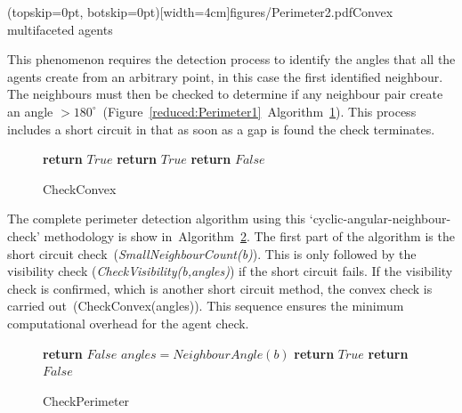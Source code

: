 \documentclass{ieeeaccess}
\begin{document}
\Figure[t!](topskip=0pt, botskip=0pt)[width=4cm]{figures/Perimeter2.pdf}{Convex multifaceted agents\label{reduced:Perimeter2}}

This phenomenon requires the detection process to identify the angles that all the agents create from an arbitrary point, in this case the first identified neighbour. The neighbours must then be checked to determine if any neighbour pair create an angle $> 180^\circ$~(Figure~\ref{reduced:Perimeter1}~Algorithm~\ref{algo:checkConvex}). This process includes a short circuit in that as soon as a gap is found the check terminates. 

\begin{figure}
\begin{algorithmic}[1]
			\State \textbf{return} $True$ 
   	\EndIf
		\State \textbf{return} $True$ 
	\EndIf
\EndFor
\State \textbf{return} $False$ 
\EndProcedure
\end{algorithmic}
\caption{CheckConvex}
\label{algo:checkConvex}
\end{figure}


The complete perimeter detection algorithm using this `cyclic-angular-neighbour-check' methodology is show in~Algorithm~\ref{algo:checkPerimeter}. The first part of the algorithm is the short circuit check~(\textit{SmallNeighbourCount(b)}). This is only followed by the visibility check (\textit{CheckVisibility(b,angles)}) if the short circuit fails. If the visibility check is confirmed, which is another short circuit method, the convex check is carried out~(CheckConvex(angles)). This sequence ensures the minimum computational overhead for the agent check. 

\begin{figure}
\begin{algorithmic}[1]
	\State \textbf{return} $False$ 
\EndIf
\State $angles = NeighbourAngle(b)$
		\State \textbf{return} $True$ 
	\EndIf
\EndIf
\State \textbf{return} $False$ 
\EndProcedure
\end{algorithmic}
\caption{CheckPerimeter}
\label{algo:checkPerimeter}
\end{figure}
\end{document}
